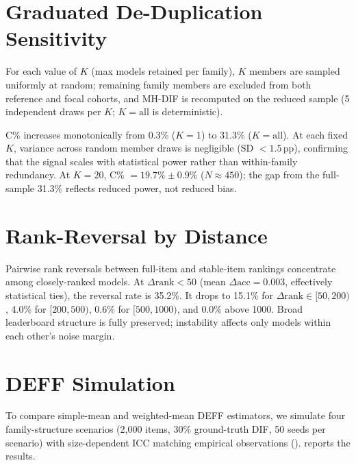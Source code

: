 \section{Graduated De-Duplication Sensitivity}
\label{app:dedup_k}

For each value of $K$ (max models retained per family), $K$ members are sampled uniformly at random; remaining family members are excluded from both reference and focal cohorts, and MH-DIF is recomputed on the reduced sample (5 independent draws per $K$; $K = \text{all}$ is deterministic).

C\% increases monotonically from 0.3\% ($K = 1$) to 31.3\% ($K = \text{all}$). At each fixed $K$, variance across random member draws is negligible (SD ${<} 1.5$\,pp), confirming that the signal scales with statistical power rather than within-family redundancy. At $K{=}20$, C\% $= 19.7\% \pm 0.9\%$ ($N \approx 450$); the gap from the full-sample 31.3\% reflects reduced power, not reduced bias.

\section{Rank-Reversal by Distance}
\label{app:rank_reversal}

Pairwise rank reversals between full-item and stable-item rankings concentrate among closely-ranked models. At $\Delta\mathrm{rank} < 50$ (mean $\Delta\mathrm{acc} = 0.003$, effectively statistical ties), the reversal rate is 35.2\%. It drops to 15.1\% for $\Delta\mathrm{rank} \in [50, 200)$, 4.0\% for $[200, 500)$, 0.6\% for $[500, 1000)$, and 0.0\% above 1000. Broad leaderboard structure is fully preserved; instability affects only models within each other's noise margin.

\section{DEFF Simulation}
\label{app:deff_simulation}

To compare simple-mean and weighted-mean DEFF estimators, we simulate four family-structure scenarios (2,000 items, 30\% ground-truth DIF, 50 seeds per scenario) with size-dependent ICC matching empirical observations ().  reports the results.

